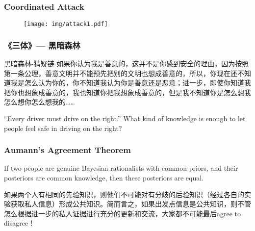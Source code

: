 \documentclass[UTF8,aspectratio=43,11pt,colorlinks,compress,openany]{beamer}%
\begin{document}
\begin{frame}\frametitle{Coordinated Attack}
	\begin{figure}[H]
		\texttt{[image: img/attack1.pdf]}
	\end{figure}
\end{frame}

\begin{frame}\frametitle{《三体》--- 黑暗森林}
\begin{block}{黑暗森林-猜疑链}
如果你认为我是善意的，这并不是你感到安全的理由，因为按照第一条公理，善意文明并不能预先把别的文明也想成善意的，所以，你现在还不知道我是怎么认为你的，你不知道我认为你是善意还是恶意；进一步，即使你知道我把你也想象成善意的，我也知道你把我想象成善意的，但是我不知道你是怎么想我怎么想你怎么想我的……
\end{block}
\begin{block}{``Every driver must drive on the right.''}
What kind of knowledge is enough to let people feel safe in driving on the right?
\end{block}
\end{frame}

\begin{frame}\frametitle{Aumann's Agreement Theorem}
\begin{theorem}
If two people are genuine Bayesian rationalists with common priors, and their posteriors are common knowledge, then these posteriors are equal.
\end{theorem}
如果两个人有相同的先验知识，则他们不可能对有分歧的后验知识（经过各自的实验获取私人信息）形成公共知识。简而言之，如果出发点信息是公共知识，则不管怎么根据进一步的私人证据进行充分的更新和交流，大家都不可能最后agree to disagree！
\end{frame}
\end{document}
